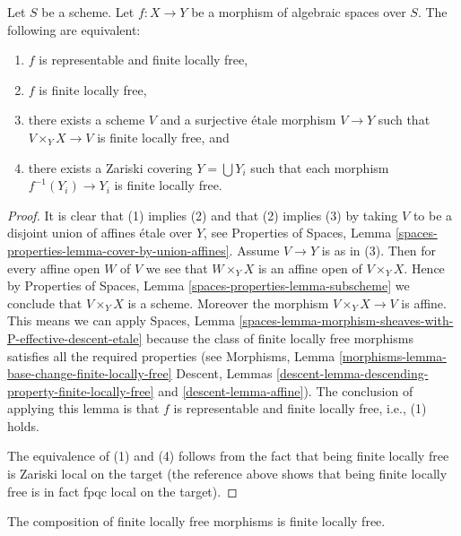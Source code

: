 \begin{lemma}
\label{lemma-finite-locally-free-local}
Let $S$ be a scheme.
Let $f : X \to Y$ be a morphism of algebraic spaces over $S$.
The following are equivalent:
\begin{enumerate}
\item $f$ is representable and finite locally free,
\item $f$ is finite locally free,
\item there exists a scheme $V$ and a surjective \'etale morphism
$V \to Y$ such that $V \times_Y X \to V$ is finite locally free, and
\item there exists a Zariski covering $Y = \bigcup Y_i$ such that
each morphism $f^{-1}(Y_i) \to Y_i$ is finite locally free.
\end{enumerate}
\end{lemma}

\begin{proof}
It is clear that (1) implies (2) and that (2) implies (3) by taking
$V$ to be a disjoint union of affines \'etale over $Y$, see
Properties of Spaces,
Lemma \ref{spaces-properties-lemma-cover-by-union-affines}.
Assume $V \to Y$ is as in (3). Then for every affine open $W$ of $V$ we see
that $W \times_Y X$ is an affine open of $V \times_Y X$. Hence by
Properties of Spaces, Lemma \ref{spaces-properties-lemma-subscheme}
we conclude that $V \times_Y X$ is a scheme. Moreover the morphism
$V \times_Y X \to V$ is affine. This means we can apply
Spaces,
Lemma \ref{spaces-lemma-morphism-sheaves-with-P-effective-descent-etale}
because the class of finite locally free morphisms
satisfies all the required properties (see
Morphisms, Lemma \ref{morphisms-lemma-base-change-finite-locally-free}
Descent, Lemmas \ref{descent-lemma-descending-property-finite-locally-free}
and \ref{descent-lemma-affine}).
The conclusion of applying this lemma is that $f$ is representable
and finite locally free, i.e., (1) holds.

\medskip\noindent
The equivalence of (1) and (4) follows from the fact that being
finite locally free is Zariski local on the target (the reference above shows
that being finite locally free is in fact fpqc local on the target).
\end{proof}

\begin{lemma}
\label{lemma-composition-finite-locally-free}
The composition of finite locally free morphisms is finite locally free.
\end{lemma}

